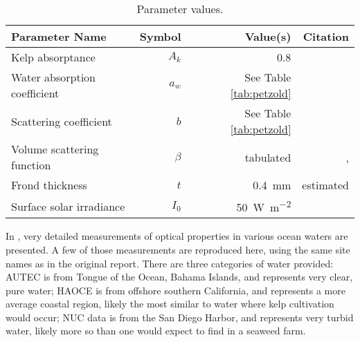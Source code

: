 \begin{table}
  \centering
  \caption{Parameter values.}
  \begin{tabular}{lrrr}
    \toprule
    Parameter Name & Symbol & Value(s) & Citation \\ %
    \midrule
    Kelp absorptance & $A_k$ & 0.8 & \cite{colombo-pallotta_photosynthetic_2006} \\%
    Water absorption coefficient & $a_w$ & See Table \ref{tab:petzold} & \cite{petzold_volume_1972} \\%
    Scattering coefficient & $b$  & See Table \ref{tab:petzold} & \cite{petzold_volume_1972} \\%
    Volume scattering function & $\beta$ & tabulated & \cite{petzold_volume_1972,sokolov_parameterization_2010}, \\%
    Frond thickness & $t$ & \SI{0.4}{\mm} & estimated \\
    Surface solar irradiance & $I_0$ & \SI{50}{\W\per\m\squared} & \cite{broch_modelling_2012}  \\%
    \bottomrule
  \end{tabular}
  \label{tab:params}
\end{table}

In \citep{petzold_volume_1972}, very detailed measurements of optical properties in various ocean waters are presented.
A few of those measurements are reproduced here, using the same site names as in the original report.
There are three categories of water provided: AUTEC is from Tongue of the Ocean, Bahama Islands,
and represents very clear, pure water; HAOCE is from offshore southern California, and represents a more average coastal region,
likely the most similar to water where kelp cultivation would occur; NUC data is from the San Diego Harbor, and represents very turbid water,
likely more so than one would expect to find in a seaweed farm.


